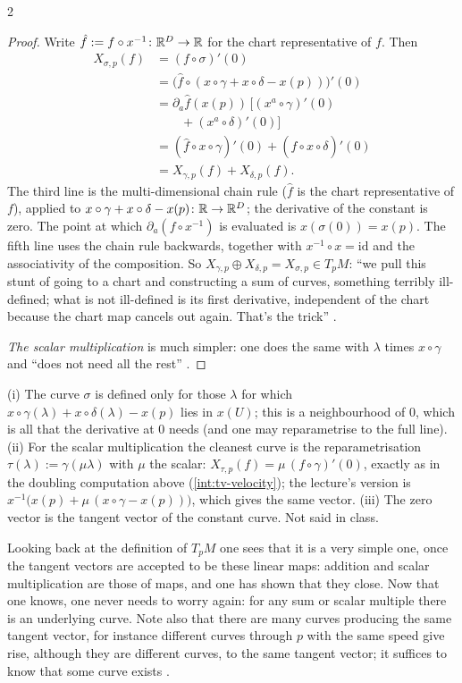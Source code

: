 \begin{paracol}{2}
\begin{proof}
Write $\hat f:=f\circ x^{-1}\colon\mathbb{R}^D\to\mathbb{R}$ for the chart representative of $f$. Then
\[\begin{aligned}
X_{\sigma,p}(f)&=(f\circ\sigma)'(0)\\
&=\bigl(\hat f\circ(x\circ\gamma+x\circ\delta-x(p))\bigr)'(0)\\
&=\partial_a\hat f(x(p))\,\bigl[(x^a\circ\gamma)'(0)\\
&\qquad+(x^a\circ\delta)'(0)\bigr]\\
&=(\hat f\circ x\circ\gamma)'(0)+(\hat f\circ x\circ\delta)'(0)\\
&=X_{\gamma,p}(f)+X_{\delta,p}(f).
\end{aligned}\]
The third line is the multi-dimensional chain rule ($\hat f$ is the chart representative of $f$), applied to $x\circ\gamma+x\circ\delta-x(p)\colon\mathbb{R}\to\mathbb{R}^D$; the derivative of the constant is zero. The point at which $\partial_a(f\circ x^{-1})$ is evaluated is $x(\sigma(0))=x(p)$. The fifth line
uses the chain rule backwards, together with $x^{-1}\circ x=\mathrm{id}$ and the associativity of the composition. So $X_{\gamma,p}\oplus X_{\delta,p}=X_{\sigma,p}\in T_pM$: ``we pull this stunt of going to a chart and constructing a sum of curves, something terribly ill-defined; what is not ill-defined is its first derivative,
independent of the chart because the chart map cancels out again. That's the trick''      .

\emph{The scalar multiplication} is much simpler: one does the same with $\lambda$ times $x\circ\gamma$ and ``does not need all the rest''  .
\end{proof}
\begin{coursenote}
(i) The curve $\sigma$ is defined only for those $\lambda$ for which $x\circ\gamma(\lambda)+x\circ\delta(\lambda)-x(p)$ lies in $x(U)$; this is a neighbourhood of $0$, which is all that the derivative at $0$ needs (and one may reparametrise to the full line). (ii) For the scalar multiplication the cleanest curve is the
reparametrisation $\tau(\lambda):=\gamma(\mu\lambda)$ with $\mu$ the scalar: $X_{\tau,p}(f)=\mu\,(f\circ\gamma)'(0)$, exactly as in the doubling computation above (\cref{int:tv-velocity}); the lecture's version is $x^{-1}\bigl(x(p)+\mu\,(x\circ\gamma-x(p))\bigr)$,
which gives the same vector. (iii) The zero vector is the tangent vector of the constant curve. Not said in class.
\end{coursenote}
Looking back at the definition of $T_pM$ one sees that it is a very simple one, once the tangent vectors are accepted to be these linear maps: addition and scalar multiplication are those of maps, and one has shown that they close. Now that one knows, one never needs to worry again:
for any sum or scalar multiple there is an underlying curve. Note also that there are many curves producing the same tangent vector, for instance different curves through $p$ with the same speed give rise, although they are different curves, to the same tangent vector; it suffices to know that some curve exists
  .


\end{paracol}
